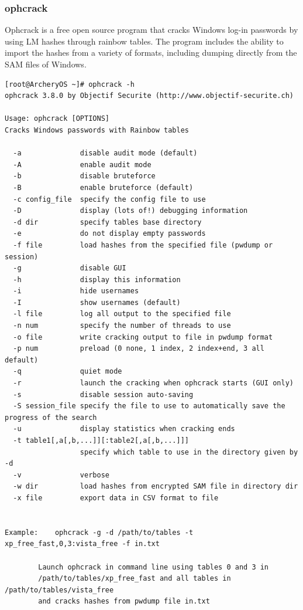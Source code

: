 \documentclass{article}
\begin{document}
\subsubsection{ophcrack}
Ophcrack is a free open source program that cracks Windows log-in passwords by using LM hashes through rainbow tables. The program includes the ability to import the hashes from a variety of formats, including dumping directly from the SAM files of Windows.
\begin{lstlisting}
[root@ArcheryOS ~]# ophcrack -h
ophcrack 3.8.0 by Objectif Securite (http://www.objectif-securite.ch)

Usage: ophcrack [OPTIONS]
Cracks Windows passwords with Rainbow tables

  -a              disable audit mode (default)
  -A              enable audit mode
  -b              disable bruteforce
  -B              enable bruteforce (default)
  -c config_file  specify the config file to use
  -D              display (lots of!) debugging information
  -d dir          specify tables base directory
  -e              do not display empty passwords
  -f file         load hashes from the specified file (pwdump or session)
  -g              disable GUI
  -h              display this information
  -i              hide usernames
  -I              show usernames (default)
  -l file         log all output to the specified file
  -n num          specify the number of threads to use
  -o file         write cracking output to file in pwdump format
  -p num          preload (0 none, 1 index, 2 index+end, 3 all default)
  -q              quiet mode
  -r              launch the cracking when ophcrack starts (GUI only)
  -s              disable session auto-saving
  -S session_file specify the file to use to automatically save the progress of the search
  -u              display statistics when cracking ends
  -t table1[,a[,b,...]][:table2[,a[,b,...]]]
                  specify which table to use in the directory given by -d
  -v              verbose
  -w dir          load hashes from encrypted SAM file in directory dir
  -x file         export data in CSV format to file


Example:	ophcrack -g -d /path/to/tables -t xp_free_fast,0,3:vista_free -f in.txt

		Launch ophcrack in command line using tables 0 and 3 in
		/path/to/tables/xp_free_fast and all tables in /path/to/tables/vista_free
		and cracks hashes from pwdump file in.txt
\end{lstlisting}
\end{document}
